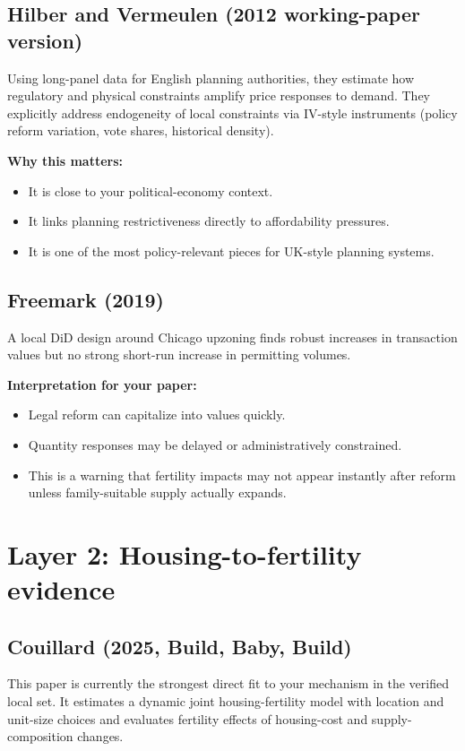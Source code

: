 \documentclass[11pt]{article}
\begin{document}
\subsection*{Hilber and Vermeulen (2012 working-paper version)}
Using long-panel data for English planning authorities, they estimate how regulatory and physical constraints amplify price responses to demand. They explicitly address endogeneity of local constraints via IV-style instruments (policy reform variation, vote shares, historical density).

\textbf{Why this matters:}
\begin{itemize}
\item It is close to your political-economy context.
\item It links planning restrictiveness directly to affordability pressures.
\item It is one of the most policy-relevant pieces for UK-style planning systems.
\end{itemize}

\subsection*{Freemark (2019)}
A local DiD design around Chicago upzoning finds robust increases in transaction values but no strong short-run increase in permitting volumes.

\textbf{Interpretation for your paper:}
\begin{itemize}
\item Legal reform can capitalize into values quickly.
\item Quantity responses may be delayed or administratively constrained.
\item This is a warning that fertility impacts may not appear instantly after reform unless family-suitable supply actually expands.
\end{itemize}

\section{Layer 2: Housing-to-fertility evidence}
\subsection*{Couillard (2025, Build, Baby, Build)}
This paper is currently the strongest direct fit to your mechanism in the verified local set. It estimates a dynamic joint housing-fertility model with location and unit-size choices and evaluates fertility effects of housing-cost and supply-composition changes.
\end{document}
